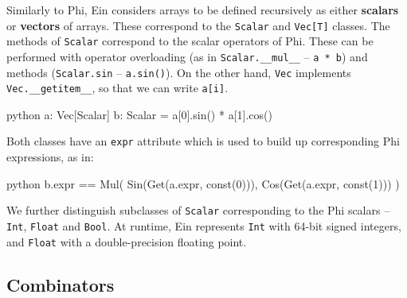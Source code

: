 Similarly to Phi, Ein considers arrays to be defined recursively as either \textbf{scalars} or \textbf{vectors} of arrays. These correspond to the \texttt{Scalar} and \texttt{Vec[T]} classes. The methods of \texttt{Scalar} correspond to the scalar operators of Phi. These can be performed with operator overloading (as in \texttt{Scalar.\_\_mul\_\_} -- \texttt{a * b}) and methods (\texttt{Scalar.sin} -- \texttt{a.sin()}). On the other hand, \texttt{Vec} implements \texttt{Vec.\_\_getitem\_\_}, so that we can write \texttt{a[i]}. 
\begin{center}
\begin{cminted}{python}
a: Vec[Scalar]
b: Scalar = a[0].sin() * a[1].cos()
\end{cminted}
\end{center}
Both classes have an \texttt{expr} attribute which is used to build up corresponding Phi expressions, as in: 
\begin{center}
\begin{cminted}{python}
b.expr == Mul(
    Sin(Get(a.expr, const(0))), 
    Cos(Get(a.expr, const(1)))
)
\end{cminted}
\end{center}

We further distinguish subclasses of \texttt{Scalar} corresponding to the Phi scalars -- \texttt{Int}, \texttt{Float} and \texttt{Bool}. At runtime, Ein represents \texttt{Int} with 64-bit signed integers, and \texttt{Float} with a double-precision floating point. 

\subsection{Combinators}

